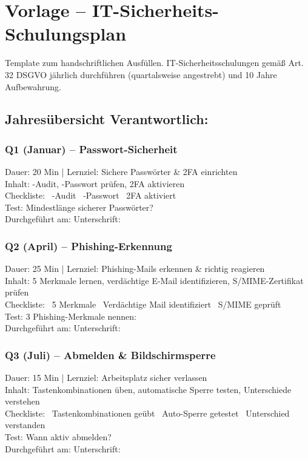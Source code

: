 \section{Vorlage – IT-Sicherheits-Schulungsplan}
\label{sec:vorlage-schulungsplan}

\Hinweis Template zum handschriftlichen Ausfüllen. IT-Sicherheitsschulungen
gemäß Art. 32 DSGVO jährlich durchführen (quartalsweise angestrebt) und 10 Jahre Aufbewahrung.

\subsection*{Jahresübersicht \FormField[2cm] \hfill Verantwortlich: \PraxisInhaberBezeichnung{}}

\ifaccessible
\subsubsection*{Q1 (Januar) -- Passwort-Sicherheit}
Dauer: 20 Min | Lernziel: Sichere Passwörter \& 2FA einrichten\\
Inhalt: \PasswortManager{}-Audit, \PVSName{}-Passwort prüfen, 2FA aktivieren\\
Checkliste: \q~\PasswortManager{}-Audit \q~\PVSName{}-Passwort \q~2FA aktiviert\\
Test: Mindestlänge sicherer Passwörter? \FormField[2cm]\\
Durchgeführt am: \FormField[3cm] Unterschrift: \FormField[4cm]

\subsubsection*{Q2 (April) -- Phishing-Erkennung}
Dauer: 25 Min | Lernziel: Phishing-Mails erkennen \& richtig reagieren\\
Inhalt: 5 Merkmale lernen, verdächtige E-Mail identifizieren, S/MIME-Zertifikat prüfen\\
Checkliste: \q~5 Merkmale \q~Verdächtige Mail identifiziert \q~S/MIME geprüft\\
Test: 3 Phishing-Merkmale nennen: \FormField[5cm]\\
Durchgeführt am: \FormField[3cm] Unterschrift: \FormField[4cm]

\subsubsection*{Q3 (Juli) -- Abmelden \& Bildschirmsperre}
Dauer: 15 Min | Lernziel: Arbeitsplatz sicher verlassen\\
Inhalt: Tastenkombinationen üben, automatische Sperre testen, Unterschiede verstehen\\
Checkliste: \q~Tastenkombinationen geübt \q~Auto-Sperre getestet \q~Unterschied verstanden\\
Test: Wann aktiv abmelden? \FormField[5cm]\\
Durchgeführt am: \FormField[3cm] Unterschrift: \FormField[4cm]

